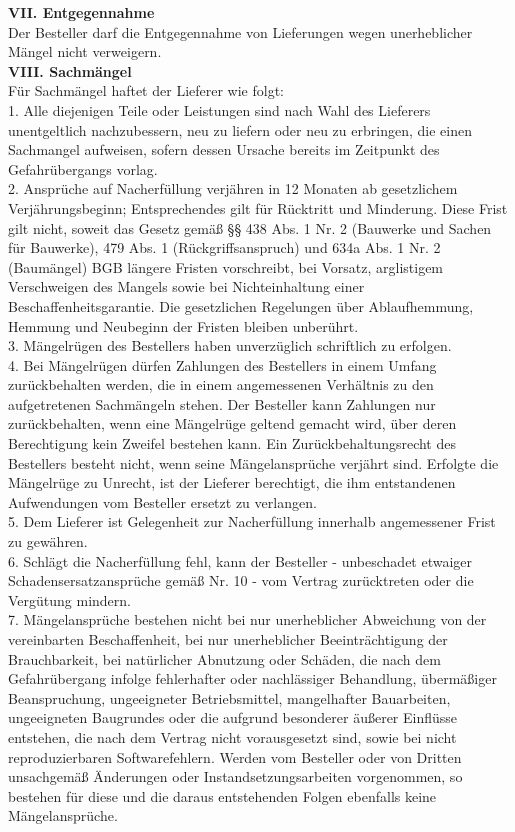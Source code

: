\begin{multicols}{2}
\begin{scriptsize}
	\textbf{VII. Entgegennahme}\\
	Der Besteller darf die Entgegennahme von Lieferungen wegen unerheblicher Mängel nicht verweigern.\\
	\textbf{VIII. Sachmängel}\\
	Für Sachmängel haftet der Lieferer wie folgt:\\
	1. Alle diejenigen Teile oder Leistungen sind nach Wahl des Lieferers unentgeltlich nachzubessern, neu zu liefern oder neu zu erbringen, die einen Sachmangel aufweisen, sofern dessen Ursache bereits im Zeitpunkt des Gefahrübergangs vorlag.\\
	2. Ansprüche auf Nacherfüllung verjähren in 12 Monaten ab gesetzlichem Verjährungsbeginn; Entsprechendes gilt für Rücktritt und Minderung. Diese Frist gilt nicht, soweit das Gesetz gemäß §§ 438 Abs. 1 Nr. 2 (Bauwerke und Sachen für Bauwerke), 479 Abs. 1 (Rückgriffsanspruch) und 634a Abs. 1 Nr. 2 (Baumängel) BGB längere Fristen vorschreibt, bei Vorsatz, arglistigem Verschweigen des Mangels sowie bei Nichteinhaltung einer Beschaffenheitsgarantie. Die gesetzlichen Regelungen über Ablaufhemmung, Hemmung und Neubeginn der Fristen bleiben unberührt.\\
	3. Mängelrügen des Bestellers haben unverzüglich schriftlich zu erfolgen.\\
	4. Bei Mängelrügen dürfen Zahlungen des Bestellers in einem Umfang zurückbehalten werden, die in einem angemessenen Verhältnis zu den aufgetretenen Sachmängeln stehen. Der Besteller kann Zahlungen nur zurückbehalten, wenn eine Mängelrüge geltend gemacht wird, über deren Berechtigung kein Zweifel bestehen kann. Ein Zurückbehaltungsrecht des Bestellers besteht nicht, wenn seine Mängelansprüche verjährt sind.
	Erfolgte die Mängelrüge zu Unrecht, ist der Lieferer berechtigt, die ihm entstandenen Aufwendungen vom Besteller ersetzt zu verlangen.\\
	5. Dem Lieferer ist Gelegenheit zur Nacherfüllung innerhalb angemessener Frist zu gewähren.\\
	6. Schlägt die Nacherfüllung fehl, kann der Besteller - unbeschadet etwaiger Schadensersatzansprüche gemäß Nr. 10 - vom Vertrag zurücktreten oder die Vergütung mindern.\\
	7. Mängelansprüche bestehen nicht bei nur unerheblicher Abweichung von der vereinbarten Beschaffenheit, bei nur unerheblicher Beeinträchtigung der Brauchbarkeit, bei natürlicher Abnutzung oder Schäden, die nach dem Gefahrübergang infolge fehlerhafter oder nachlässiger Behandlung, übermäßiger Beanspruchung, ungeeigneter Betriebsmittel, mangelhafter Bauarbeiten, ungeeigneten Baugrundes oder die aufgrund besonderer äußerer Einflüsse entstehen, die nach dem Vertrag nicht vorausgesetzt sind, sowie bei nicht reproduzierbaren Softwarefehlern. Werden vom Besteller oder von Dritten unsachgemäß Änderungen oder Instandsetzungsarbeiten vorgenommen, so bestehen für diese und die daraus entstehenden Folgen ebenfalls keine Mängelansprüche.\\

\end{scriptsize}
\end{multicols}
